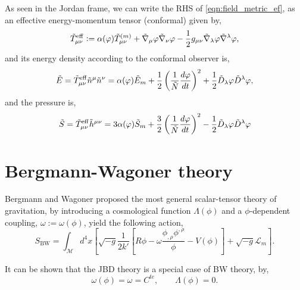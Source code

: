 As seen in the Jordan frame, we can write the RHS of \cref{eqn:field_metric_ef}, as an effective energy-momentum tensor (conformal) given by,
\begin{equation}
    \Tilde{T}^{\mathrm{eff}}_{\mu\nu}:=\alpha(\varphi)\Tilde{T}_{\mu\nu}^{(m)} + \Tilde{\nabla}_\mu\varphi\Tilde{\nabla}_\nu\varphi-\frac{1}{2}g_{\mu\nu}\Tilde{\nabla}_\lambda\varphi\Tilde{\nabla}^\lambda\varphi,
\end{equation}
and its energy density according to the conformal observer is,
\begin{equation}
    \Tilde{E}=\Tilde{T}^{\mathrm{eff}}_{\mu\nu}\Tilde{n}^\mu\Tilde{n}^\nu =\alpha(\varphi)\Tilde{E}_m+\frac{1}{2}\left(\frac{1}{\Tilde{N}}\frac{d\varphi}{dt}\right)^2+\frac{1}{2}\Tilde{D}_\lambda\varphi\Tilde{D}^\lambda\varphi,
    \label{eqn:energy_density_ef}
\end{equation}
and the pressure is,
\begin{equation}
\Tilde{S}=\Tilde{T}^{\mathrm{eff}}_{\mu\nu}\Tilde{h}^{\mu\nu}=3\alpha(\varphi)\Tilde{S}_m+\frac{3}{2}\left(\frac{1}{\Tilde{N}}\frac{d\varphi}{dt}\right)^2-\frac{1}{2}\Tilde{D}_\lambda\varphi\Tilde{D}^\lambda\varphi
    \label{eqn:pressure_ef}
\end{equation}




\section{Bergmann-Wagoner theory}

Bergmann \cite{Bergmann1968} and Wagoner \cite{wagoner1970} proposed the most general scalar-tensor theory of gravitation, by introducing a cosmological function $\Lambda(\phi)$ and a $\phi$-dependent coupling, $\omega:=\omega(\phi)$, yield the following action,
\begin{equation}
    S_{\text{BW}}=\int_{\mathcal{M}} d^4x\left[ \sqrt{-g}\frac{1}{2k'}\left[R\phi-\omega \frac{\phi_{,\rho}\phi^{,\rho}}{\phi}-V(\phi)\right]+\sqrt{-g}\mathcal{L}_m\right].
    \label{eqn:BD_action_JF}
\end{equation}

It can be shown that the JBD theory is a special case of BW theory, by,
\begin{equation}
    \omega(\phi)=\omega=C^{te},\qquad \Lambda(\phi)=0.
\end{equation}

